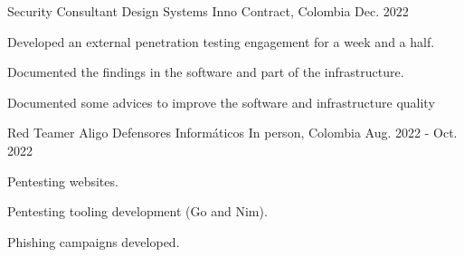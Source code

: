 \begin{cventries}
  \cventry
  {Security Consultant} %
  {Design Systems Inno} %
  {Contract, Colombia} %
  {Dec. 2022} %
  {
    \begin{cvitems} %
      \item {Developed an external penetration testing engagement for a week and a half.}
      \item {Documented the findings in the software and part of the infrastructure.}
      \item {Documented some advices to improve the software and infrastructure quality}
    \end{cvitems}
  }

  \cventry
  {Red Teamer} %
  {Aligo Defensores Informáticos} %
  {In person, Colombia} %
  {Aug. 2022 - Oct. 2022} %
  {
    \begin{cvitems} %
      \item {Pentesting websites.}
      \item {Pentesting tooling development (Go and Nim).}
      \item {Phishing campaigns developed.}
    \end{cvitems}
  }


\end{cventries}
